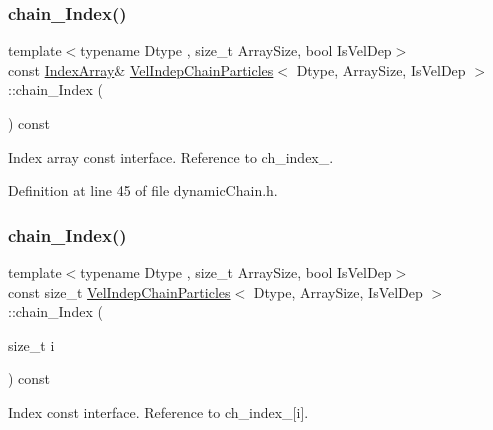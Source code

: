 \subsubsection{\texorpdfstring{chain_\+Index()}{chainIndex()}\hspace{0.1cm}{\footnotesize\ttfamily [1/2]}}
{\footnotesize\ttfamily template$<$typename Dtype , size\+\_\+t Array\+Size, bool Is\+Vel\+Dep$>$ \\
const \mbox{\hyperlink{class_vel_indep_chain_particles_a691749351fb710d16619ef6cc43bb1e6}{Index\+Array}}\& \mbox{\hyperlink{class_vel_indep_chain_particles}{Vel\+Indep\+Chain\+Particles}}$<$ Dtype, Array\+Size, Is\+Vel\+Dep $>$\+::chain_\+Index (\begin{DoxyParamCaption}{ }\end{DoxyParamCaption}) const\hspace{0.3cm}{\ttfamily [inline]}}



Index array const interface. Reference to ch\+\_\+index\+\_\+. 



Definition at line 45 of file dynamic\+Chain.\+h.

\mbox{\label{class_vel_indep_chain_particles_ad2cec742c8fa63849b9ff5b8876f879a}} 
\subsubsection{\texorpdfstring{chain_\+Index()}{chainIndex()}\hspace{0.1cm}{\footnotesize\ttfamily [2/2]}}
{\footnotesize\ttfamily template$<$typename Dtype , size\+\_\+t Array\+Size, bool Is\+Vel\+Dep$>$ \\
const size\+\_\+t \mbox{\hyperlink{class_vel_indep_chain_particles}{Vel\+Indep\+Chain\+Particles}}$<$ Dtype, Array\+Size, Is\+Vel\+Dep $>$\+::chain_\+Index (\begin{DoxyParamCaption}\item[{size\+\_\+t}]{i }\end{DoxyParamCaption}) const\hspace{0.3cm}{\ttfamily [inline]}}



Index const interface. Reference to ch\+\_\+index\+\_\+\mbox{[}i\mbox{]}. 



